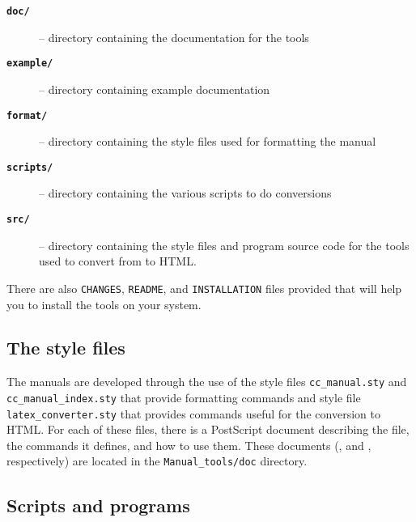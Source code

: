 \begin{description}
   \item[{\bf\tt doc/}] -- directory containing the documentation for
        the tools
   \item[{\bf\tt example/}] -- directory containing example documentation
   \item[{\bf\tt format/}] -- directory containing the 
         style files
        used for formatting the manual
   \item[{\bf\tt scripts/}] -- directory containing the various scripts
        to do conversions
   \item[{\bf\tt src/}] -- directory containing the style files and program
        source code for the tools used to convert from 
         to HTML.
\end{description}

There are also {\tt CHANGES}, {\tt README}, and {\tt INSTALLATION} files 
provided that will help you to install the tools on your system.

\subsection{The style files}
\label{subsec:manual_style_files}

The manuals are developed through the use of the style files 
{\tt cc\_manual.sty} and 
{\tt cc\_manual\_index.sty}
that provide formatting
commands and style file {\tt latex\_converter.sty}
that provides commands
useful for the conversion to HTML.  
For each of these files, there is a PostScript document describing 
the file, the commands it defines, and how to use them.  These documents 
(, 
 and
, respectively)
are located in the {\tt Manual\_tools/doc} 
directory.

\subsection{Scripts and programs}
\label{sec:manual_scripts}

